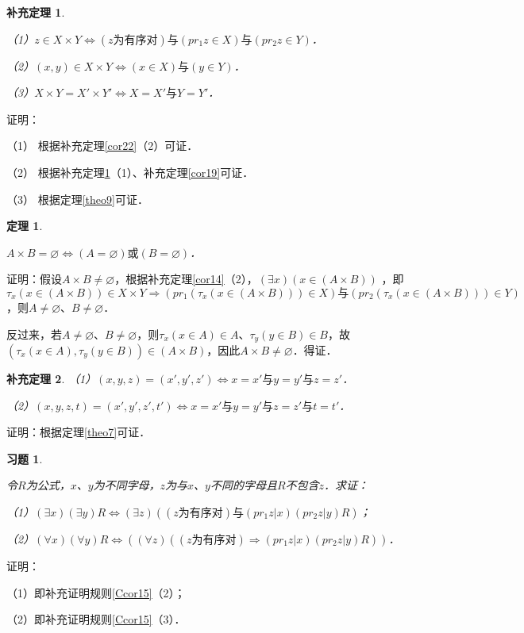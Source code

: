 \documentclass[12pt, a4paper, oneside]{book}
\newtheorem{theo}{定理}
\newtheorem{cor}{补充定理}
\newtheorem{exer}{习题}
\begin{document}
			\begin{cor}\label{cor23}
				\hfill\par
				（1）$z\in X\times Y\Leftrightarrow (z\text{为有序对})\text{与}(pr_1z\in X)\text{与}(pr_2z\in Y)$．
				\par
				（2）$(x, y)\in X\times Y\Leftrightarrow (x\in X)\text{与}(y\in Y)$．
				\par
				（3）$X\times Y=X'\times Y'\Leftrightarrow X=X'\text{与}Y=Y'$．
			\end{cor}
			证明：
			\par
			（1）	根据补充定理\ref{cor22}（2）可证．
			\par
			（2）	根据补充定理\ref{cor23}（1）、补充定理\ref{cor19}可证．
			\par
			（3）	根据定理\ref{theo9}可证．

			\begin{theo}\label{theo10}
				\hfill\par
				$A\times B=\varnothing\Leftrightarrow (A=\varnothing)\text{或}(B=\varnothing)$．
			\end{theo}
			证明：假设$A\times B\neq \varnothing$，根据补充定理\ref{cor14}（2），$(\exists x)(x\in (A\times B))$ ，即$\tau_x(x\in (A\times B))\in X\times Y\Rightarrow (pr_1(\tau_x(x\in (A\times B)))\in X)\text{与}(pr_2(\tau_x(x\in (A\times B)))\in Y)$，则$A\neq \varnothing$、$B\neq \varnothing$．
			\par
			反过来，若$A\neq \varnothing$、$B\neq \varnothing$，则$\tau_x(x\in A)\in A$、$\tau_y(y\in B)\in B$，故$(\tau_x(x\in A), \tau_y(y\in B))\in (A\times B)$，因此$A\times B\neq \varnothing$．得证．

			\begin{cor}
				\hfill\par
				（1）$(x , y, z)=(x', y', z')\Leftrightarrow x=x'\text{与}y=y'\text{与}z=z'$．
				\par
				（2）$(x , y, z, t)=(x', y', z', t')\Leftrightarrow x=x'\text{与}y=y'\text{与}z=z'\text{与}t=t'$．
			\end{cor}
			证明：根据定理\ref{theo7}可证．

			\begin{exer}\label{exer42}
				\hfill\par
				令$R$为公式，$x$、$y$为不同字母，$z$为与$x$、$y$不同的字母且$R$不包含$z$．求证：
				\par
				（1）$(\exists x)(\exists y)R\Leftrightarrow (\exists z)((z\text{为有序对})\text{与}(pr_1z|x)(pr_2z|y)R)$；
				\par
				（2）$(\forall x)(\forall y)R\Leftrightarrow ((\forall z)((z\text{为有序对})\Rightarrow (pr_1z|x)(pr_2z|y)R))$．
			\end{exer}
			证明：
			\par
			（1）即补充证明规则\ref{Ccor15}（2）；
			\par
			（2）即补充证明规则\ref{Ccor15}（3）．
\end{document}
